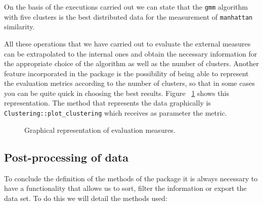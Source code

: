 On the basis of the executions carried out we can state that the \texttt{gmm} algorithm with five clusters is the best distributed data for the measurement of \texttt{manhattan} similarity.

All these operations that we have carried out to evaluate the external measures can be extrapolated to the internal ones and obtain the necessary information for the appropriate choice of the algorithm as well as the number of clusters. Another feature incorporated in the package is the possibility of being able to represent the evaluation metrics according to the number of clusters, so that in some cases you can be quite quick in choosing the best results. Figure ~\ref{fig:clustering} shows this representation. The method that represents the data graphically is \texttt{Clustering::plot\_clustering} which receives as parameter the metric.

\begin{figure}[htbp]
  \centering
    \qquad
    \caption{Graphical representation of evaluation measures.}%
    \label{fig:clustering}%
\end{figure}

\subsection {Post-processing of data}

To conclude the definition of the methods of the package it is always necessary to have a functionality that allows us to sort, filter the information or export the data set. To do this we will detail the methods used:

